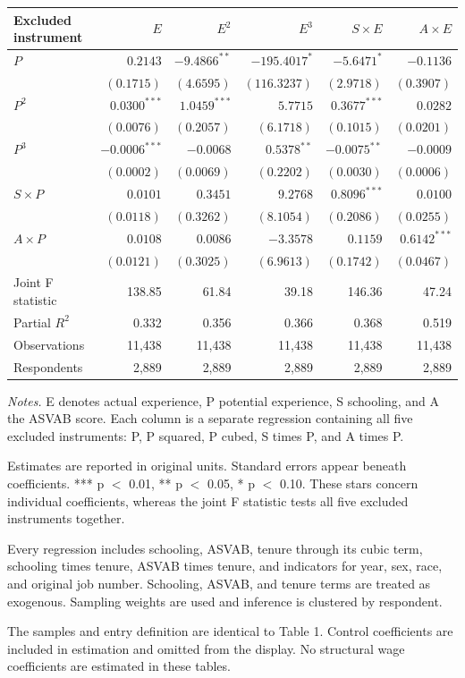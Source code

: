 \documentclass[10pt,letterpaper]{article}
\begin{document}
\noindent\begin{tabular*}{\textwidth}{@{\extracolsep{\fill}}lrrrrr@{}}
\toprule
Excluded instrument & $E$ & $E^2$ & $E^3$ & $S\times E$ & $A\times E$ \\
\midrule
$P$ & $0.2143$ & $-9.4866^{**}$ & $-195.4017^{*}$ & $-5.6471^{*}$ & $-0.1136$ \\
 & $(0.1715)$ & $(4.6595)$ & $(116.3237)$ & $(2.9718)$ & $(0.3907)$ \\[2pt]
$P^2$ & $0.0300^{***}$ & $1.0459^{***}$ & $5.7715$ & $0.3677^{***}$ & $0.0282$ \\
 & $(0.0076)$ & $(0.2057)$ & $(6.1718)$ & $(0.1015)$ & $(0.0201)$ \\[2pt]
$P^3$ & $-0.0006^{***}$ & $-0.0068$ & $0.5378^{**}$ & $-0.0075^{**}$ & $-0.0009$ \\
 & $(0.0002)$ & $(0.0069)$ & $(0.2202)$ & $(0.0030)$ & $(0.0006)$ \\[2pt]
$S\times P$ & $0.0101$ & $0.3451$ & $9.2768$ & $0.8096^{***}$ & $0.0100$ \\
 & $(0.0118)$ & $(0.3262)$ & $(8.1054)$ & $(0.2086)$ & $(0.0255)$ \\[2pt]
$A\times P$ & $0.0108$ & $0.0086$ & $-3.3578$ & $0.1159$ & $0.6142^{***}$ \\
 & $(0.0121)$ & $(0.3025)$ & $(6.9613)$ & $(0.1742)$ & $(0.0467)$ \\[2pt]
\midrule
Joint F statistic & 138.85 & 61.84 & 39.18 & 146.36 & 47.24 \\
Partial $R^2$ & 0.332 & 0.356 & 0.366 & 0.368 & 0.519 \\
Observations & 11,438 & 11,438 & 11,438 & 11,438 & 11,438 \\
Respondents & 2,889 & 2,889 & 2,889 & 2,889 & 2,889 \\
\bottomrule
\end{tabular*}\par\smallskip
\medskip
{\footnotesize
\noindent\textit{Notes.} E denotes actual experience, P potential experience, S schooling, and A the ASVAB score. Each column is a separate regression containing all five excluded instruments: P, P squared, P cubed, S times P, and A times P.\par
\smallskip\noindent Estimates are reported in original units. Standard errors appear beneath coefficients. *** p $<$ 0.01, ** p $<$ 0.05, * p $<$ 0.10. These stars concern individual coefficients, whereas the joint F statistic tests all five excluded instruments together.\par
\smallskip\noindent Every regression includes schooling, ASVAB, tenure through its cubic term, schooling times tenure, ASVAB times tenure, and indicators for year, sex, race, and original job number. Schooling, ASVAB, and tenure terms are treated as exogenous. Sampling weights are used and inference is clustered by respondent.\par
\smallskip\noindent The samples and entry definition are identical to Table 1. Control coefficients are included in estimation and omitted from the display. No structural wage coefficients are estimated in these tables.\par
}
\end{document}
